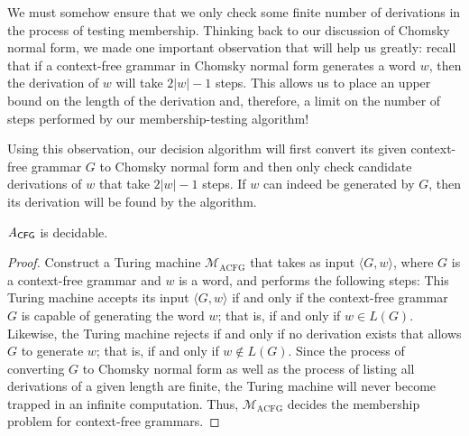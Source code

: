 We must somehow ensure that we only check some finite number of derivations in the process of testing membership. Thinking back to our discussion of Chomsky normal form, we made one important observation that will help us greatly: recall that if a context-free grammar in Chomsky normal form generates a word $w$, then the derivation of $w$ will take $2|w| - 1$ steps. This allows us to place an upper bound on the length of the derivation and, therefore, a limit on the number of steps performed by our membership-testing algorithm!

Using this observation, our decision algorithm will first convert its given context-free grammar $G$ to Chomsky normal form and then only check candidate derivations of $w$ that take $2|w| - 1$ steps. If $w$ can indeed be generated by $G$, then its derivation will be found by the algorithm.

\begin{theorem}\label{thm:ACFGdecidable}
$\mathit{A}_{\textsf{CFG}}$ is decidable.

\begin{proof}
Construct a Turing machine $\mathcal{M}_{\mathrm{ACFG}}$ that takes as input $\langle G, w \rangle$, where $G$ is a context-free grammar and $w$ is a word, and performs the following steps:
This Turing machine accepts its input $\langle G, w \rangle$ if and only if the context-free grammar $G$ is capable of generating the word $w$; that is, if and only if $w \in L(G)$. Likewise, the Turing machine rejects if and only if no derivation exists that allows $G$ to generate $w$; that is, if and only if $w \not\in L(G)$. Since the process of converting $G$ to Chomsky normal form as well as the process of listing all derivations of a given length are finite, the Turing machine will never become trapped in an infinite computation. Thus, $\mathcal{M}_{\mathrm{ACFG}}$ decides the membership problem for context-free grammars.
\end{proof}
\end{theorem}

